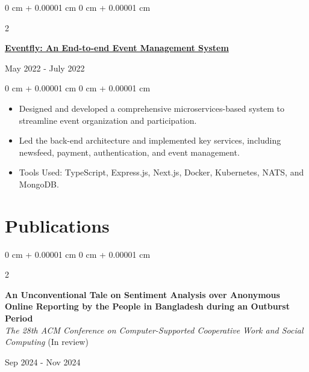 \documentclass[10pt, letterpaper]{article}
\newenvironment{highlights}{
    \begin{itemize}[
        topsep=0.10 cm,
        parsep=0.10 cm,
        partopsep=0pt,
        itemsep=0pt,
        leftmargin=0 cm + 10pt
    ]
}{
    \end{itemize}
} %
\newenvironment{onecolentry}{
    \begin{adjustwidth}{
        0 cm + 0.00001 cm
    }{
        0 cm + 0.00001 cm
    }
}{
    \end{adjustwidth}
} %
\newenvironment{twocolentry}[2][]{
    \onecolentry
    \def\secondColumn{#2}
    \setcolumnwidth{\fill, 4.5 cm}
    \begin{paracol}{2}
}{
    \switchcolumn \raggedleft \secondColumn
    \end{paracol}
    \endonecolentry
} %
\begin{document}
\begin{twocolentry}{
            {May 2022 - July 2022}
        }
            \href{https://github.com/eventfly/Microservices}{\textbf{Eventfly: An End-to-end Event Management System}}
        \end{twocolentry}
        
        \vspace{0.10 cm}
        
        \begin{onecolentry}
            \begin{highlights}
    \item Designed and developed a comprehensive microservices-based system to streamline event organization and participation.
    \item Led the back-end architecture and implemented key services, including newsfeed, payment, authentication, and event management.
    \item Tools Used: TypeScript, Express.js, Next.js, Docker, Kubernetes, NATS, and MongoDB.
\end{highlights}
        \end{onecolentry}


        \vspace{0.2 cm}

\section{Publications}

\begin{twocolentry}{Sep 2024 - Nov 2024}
    \textbf{An Unconventional Tale on Sentiment Analysis over Anonymous Online Reporting by the People in Bangladesh during an Outburst Period} \\
    \textit{The 28th ACM Conference on Computer-Supported Cooperative Work and Social Computing} (In review)
\end{twocolentry}
\end{document}
